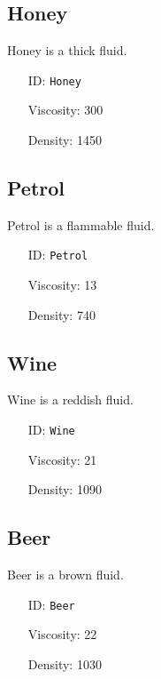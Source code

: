 \subsection{Honey}\label{subsec:fluids_honey}
Honey is a thick fluid.
\newline
\begin{itemize}[nosep]
    \item[ID:] \texttt{Honey}
    \item[Viscosity:] 300
    \item[Density:] 1450
\end{itemize}

\subsection{Petrol}\label{subsec:fluids_petrol}
Petrol is a flammable fluid.
\newline
\begin{itemize}[nosep]
    \item[ID:] \texttt{Petrol}
    \item[Viscosity:] 13
    \item[Density:] 740
\end{itemize}

\subsection{Wine}\label{subsec:fluids_wine}
Wine is a reddish fluid.
\newline
\begin{itemize}[nosep]
    \item[ID:] \texttt{Wine}
    \item[Viscosity:] 21
    \item[Density:] 1090
\end{itemize}

\subsection{Beer}\label{subsec:fluids_beer}
Beer is a brown fluid.
\newline
\begin{itemize}[nosep]
    \item[ID:] \texttt{Beer}
    \item[Viscosity:] 22
    \item[Density:] 1030
\end{itemize}
